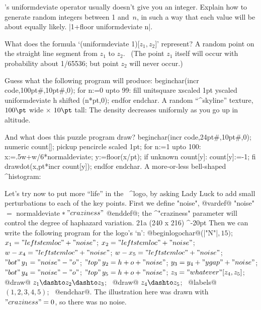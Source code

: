\exercise \MF's uniformdeviate operator usually doesn't give you an integer.
Explain how to generate random integers between 1 and~$n$, in such a way
that each value will be about equally likely.
\answer |1+floor uniformdeviate n|.

\exercise What does the formula `(uniformdeviate 1)[$z_1,z_2$]' represent?
\answer A random point on the straight line segment from $z_1$ to $z_2$.
\ (The point $z_1$ itself will occur with probability about 1/65536;
but point $z_2$ will never occur.)

\exercise Guess what the following program will produce:
\begintt
beginchar(incr code,100pt#,10pt#,0);
for n:=0 upto 99:
 fill unitsquare xscaled 1pt yscaled uniformdeviate h
  shifted (n*pt,0); endfor endchar.
\endtt
\answer A random ``^{skyline}'' texture, $100\pt$ wide $\times$ $10\pt$ tall:
{\rand{}} The density decreases uniformly as you go up in altitude.

\dangerexercise And what does this puzzle program draw?
\begintt
beginchar(incr code,24pt#,10pt#,0);
numeric count[];
pickup pencircle scaled 1pt;
for n:=1 upto 100:
 x:=.5w+w/6*normaldeviate;
 y:=floor(x/pt);
 if unknown count[y]: count[y]:=-1; fi
 drawdot(x,pt*incr count[y]); endfor endchar.
\endtt
\answer A more-or-less bell-shaped ^{histogram}: {\rand{}}

\danger Let's try now to put more ``life'' in the \MF\ ^{logo}, by
asking Lady Luck to add small perturbations to each of the key points.
First we define "noise",
\begindisplay
@vardef@ "noise" $=$ normaldeviate$\null\ast"craziness"$ @enddef@;
\enddisplay
the ^"craziness" parameter will control the degree of haphazard variation.
\rightfig 21a ({240\apspix} x {216\apspix}) ^-20pt
Then we can write the following program for the logo's `{\manual n}':
\begindisplay
@beginlogochar@\thinspace(|"N"|$,15)$;\cr
$x_1="leftstemloc"+"noise"$;\cr
$x_2="leftstemloc"+"noise"$;\cr
$w-x_4="leftstemloc"+"noise"$;\cr
$w-x_5="leftstemloc"+"noise"$;\cr
$"bot"\,y_1="noise"-"o"$;\cr
$"top"\,y_2=h+o+"noise"$;\cr
$y_3=y_4+"ygap"+"noise"$;\cr
$"bot"\,y_4="noise"-"o"$;\cr
$"top"\,y_5=h+o+"noise"$;\cr
$z_3="whatever"[z_4,z_5]$;\cr
@draw@ $z_1\dashto z_2\dashto z_3$; \
@draw@ $z_4\dashto z_5$; \ @labels@$(1,2,3,4,5)$; \ @endchar@.
\enddisplay
The illustration here was drawn with $"craziness"=0$, so there was no noise.

